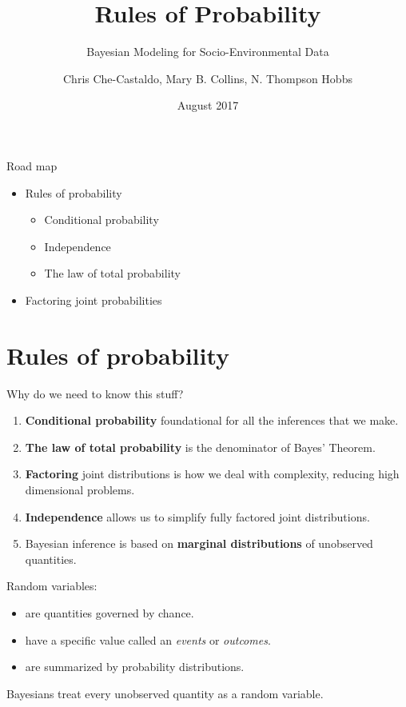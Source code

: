 \documentclass[ignorenonframetext,]{beamer}
\title{Rules of Probability}
\subtitle{Bayesian Modeling for Socio-Environmental Data}
\author{Chris Che-Castaldo, Mary B. Collins, N. Thompson Hobbs}
\date{August 2017}
\providecommand{\tightlist}{%
  \setlength{\itemsep}{0pt}\setlength{\parskip}{0pt}}
\begin{document}
\frame{\titlepage}

\begin{frame}{Road map}

\begin{itemize}
\tightlist
\item
  Rules of probability

  \begin{itemize}
  \tightlist
  \item
    Conditional probability
  \item
    Independence
  \item
    The law of total probability
  \end{itemize}
\item
  Factoring joint probabilities
\end{itemize}

\end{frame}

\section{Rules of probability}\label{rules-of-probability}

\begin{frame}{Why do we need to know this stuff?}

\begin{enumerate}
\def\labelenumi{\arabic{enumi}.}
\tightlist
\item
  \textbf{Conditional probability} foundational for all the inferences
  that we make.
\item
  \textbf{The law of total probability} is the denominator of Bayes'
  Theorem.
\item
  \textbf{Factoring} joint distributions is how we deal with complexity,
  reducing high dimensional problems.
\item
  \textbf{Independence} allows us to simplify fully factored joint
  distributions.
\item
  Bayesian inference is based on \textbf{marginal distributions} of
  unobserved quantities.
\end{enumerate}

\end{frame}

\begin{frame}{Random variables:}

\begin{itemize}
\tightlist
\item
  are quantities governed by chance.
\item
  have a specific value called an \emph{events} or \emph{outcomes}.
\item
  are summarized by probability distributions.
\end{itemize}

Bayesians treat every unobserved quantity as a random variable.

\end{frame}
\end{document}
